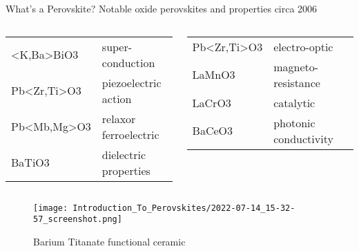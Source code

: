 \documentclass[10pt, aspectratio=169, presentation]{beamer}
\begin{document}
\begin{frame}[label={sec:orgae32b47}]{What's a Perovskite?}
Notable oxide perovskites and properties circa 2006
\autocite{jiang-2006-predic-lattic}
\begin{columns}
\begin{column}{0.5\columnwidth}
\small
\begin{center}
\begin{tabular}{ll}
<K,Ba>BiO3 & super-conduction\\[0pt]
Pb<Zr,Ti>O3 & piezoelectric action\\[0pt]
Pb<Mb,Mg>O3 & relaxor ferroelectric\\[0pt]
BaTiO3 & dielectric properties\\[0pt]
\end{tabular}
\end{center}
\end{column}
\begin{column}{0.5\columnwidth}
\small
\begin{center}
\begin{tabular}{ll}
Pb<Zr,Ti>O3 & electro-optic\\[0pt]
LaMnO3 & magneto-resistance\\[0pt]
LaCrO3 & catalytic\\[0pt]
BaCeO3 & photonic conductivity\\[0pt]
\end{tabular}
\end{center}
\end{column}
\end{columns}
\begin{figure}[htbp]
\centering
\texttt{[image: Introduction\_To\_Perovskites/2022-07-14\_15-32-57\_screenshot.png]}
\caption{Barium Titanate functional ceramic}
\end{figure}
\end{frame}
\end{document}
